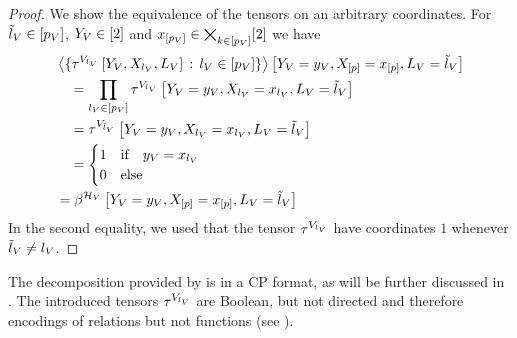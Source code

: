 \begin{proof}
	We show the equivalence of the tensors on an arbitrary coordinates.
	For $\tilde{l}_{V}\in[p_{V}]$, $Y_{V}\in[2]$ and $x_{[p_{V}]}\in\bigtimes_{k\in[p_{V}]}[2]$ we have
	\begin{align*}
		& \left\langle 
			\{\tau^{V_{l_{V}}}\left[Y_{V},X_{l_{V}},L_{V}\right] \, : \, l_{V}\in[p_{V}]\}
		\right\rangle \left[ Y_{V}=y_{V},X_{[p]}=x_{[p]},L_{V} = \tilde{l}_{V} \right] \\
		& \quad = 
		\prod_{l_{V}\in[p_{V}]} \tau^{V_{l_{V}}}\left[
			Y_{V}=y_{V},X_{l_{V}}=x_{l_{V}},L_{V}=\tilde{l}_{V}
			\right] \\
		& \quad = \tau^{V_{\tilde{l}_{V}}}\left[
			Y_{V}=y_{V},X_{l_{V}}=x_{l_{V}},L_{V}=\tilde{l}_{V}
		\right] \\
		& \quad = 
		\begin{cases}
		 	1 & \text{if} \quad y_{V} = x_{l_{V}} \\
		 	0 & \text{else}  
		 \end{cases} \\
		 & = \beta^{\mathcal{H}_{V}}\left[Y_{V}=y_{V},X_{[p]}=x_{[p]},L_{V}=\tilde{l}_{V}\right]
	\end{align*}
	In the second equality, we used that the tensor $\tau^{V_{l_{V}}}$ have coordinates $1$ whenever $\tilde{l}_{V}\neq l_{V}$.
\end{proof}


The decomposition provided by  is in a CP format, as will be further discussed in .
The introduced tensors $\tau^{V_{l_{V}}}$ are Boolean, but not directed and therefore encodings of relations but not functions (see ).

